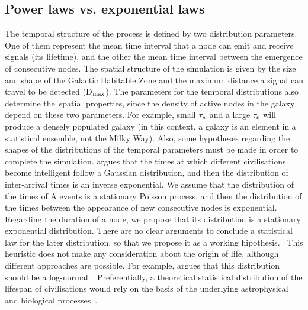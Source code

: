 \documentclass[crop]{CSLB}
\newcommand{\cetis}{nodes}
\begin{document}
    

\subsection{Power laws vs. exponential laws}\label{SS_PDF_shape}

The temporal structure of the process is defined by two distribution
parameters. One of them represent the mean time interval that a node
can emit and receive signals (its lifetime), and the other the mean
time interval between the emergence of consecutive \cetis{}.
%
The spatial structure of the simulation is given by the size and shape
of the Galactic Habitable Zone and the maximum distance a signal can
travel to be detected (D$_{\rm max}$).
%
The parameters for the temporal distributions also determine
the spatial properties, since the density of active \cetis{} in the
galaxy depend on these two parameters.
%
For example, small $\tau_{\rm a}$ and a large $\tau_{\rm s}$ will
produce a densely populated galaxy (in this context, a galaxy is an
element in a statistical ensemble, not the Milky Way).
%
Also, some hypotheses regarding the shapes of the distributions of the
temporal parameters must be made in order to complete the simulation.
%
\citet{forgan_spatiotemporal_2011} argues that the times at which
different civilisations become intelligent follow a Gaussian
distribution, and then the distribution of inter-arrival times is an
inverse exponential.
%
We assume that the distribution of the times of A events is a
stationary Poisson process, and then the distribution of the times
between the appearance of new consecutive nodes is exponential.
%
Regarding the duration of a node, we propose that its distribution is
a stationary exponential distribution.
%
There are no clear arguments to conclude a statistical law for the
later distribution, so that we propose it as a working hipothesis.  
%
This heuristic does not make any consideration about the origin of
life, although different approaches are possible.
%
For example, \citet{maccone_lognormals_2014} argues that this
distribution should be a log-normal. 
%
Preferentially, a theoretical statistical distribution of the lifespan
of civilisations would rely on the basis of the underlying
astrophysical and biological processes \citep{balbi_impact_2018}. 
\end{document}
